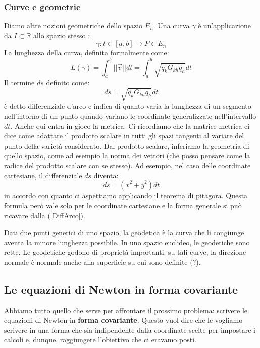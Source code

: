 \documentclass[a4paper,openany]{article}
\begin{document}
	\subsubsection{Curve e geometrie}
	Diamo altre nozioni geometriche dello spazio $E_{n}$. Una curva $\gamma$ è un'applicazione da $I\subset\mathbb{R}$ allo spazio stesso :
	$$
	\gamma : t \in [a,b] \to P \in E_{n}
	$$
	La lunghezza della curva, definita formalmente come:
	\begin{equation}
		L(\gamma) = \int_{a}^{b}||\vec{v}||dt = \int_{a}^{b}\sqrt{\dot{q}_{k}G_{kh}\dot{q}_{h}}dt
	\end{equation}
	Il termine $ds$ definito come:
	\begin{equation}
		ds = \sqrt{\dot{q}_{k}G_{kh}\dot{q}_{h}}dt
		\label{DiffArco}
	\end{equation}
	è detto differenziale d'arco e indica di quanto varia la lunghezza di un segmento nell'intorno di un punto quando variano le coordinate generalizzate nell'intervallo $dt$. Anche qui entra in gioco la metrica. Ci ricordiamo che la matrice metrica ci dice come adattare il prodotto scalare in tutti gli spazi tangenti al variare del punto della varietà considerato. Dal prodotto scalare, inferiamo la geometria di quello spazio, come ad esempio la norma dei vettori (che posso pensare come la radice del prodotto scalare con se stesso). Ad esempio, nel caso delle coordinate cartesiane, il differenziale $ds$ diventa:
	$$
	ds = (\dot{x}^{2}+\dot{y}^{2})dt
	$$
	in accordo con quanto ci aspettiamo applicando il teorema di pitagora. Questa formula però vale solo per le coordinate cartesiane e la forma generale si può ricavare dalla (\ref{DiffArco}).
	
	Dati due punti generici di uno spazio, la geodetica è la curva che li congiunge aventa la minore lunghezza possibile. In uno spazio euclideo, le geodetiche sono rette. Le geodetiche godono di proprietà importanti: su tali curve, la direzione normale è normale anche alla superficie su cui sono definite (?).
	
	\subsection{Le equazioni di Newton in forma covariante}
	Abbiamo tutto quello che serve per affrontare il prossimo problema: scrivere le equazioni di Newton in \textbf{forma covariante}. Questo vuol dire che le vogliamo scrivere in una forma che sia indipendente dalla coordinate scelte per impostare i calcoli e, dunque, raggiungere l'obiettivo che ci eravamo posti. 
	
\end{document}
